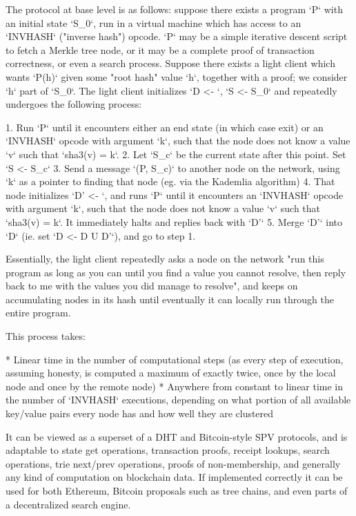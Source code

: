 \documentclass[10pt,a4paper,oneside]{scrartcl}
\begin{document}
The protocol at base level is as follows: suppose there exists a program `P` with an initial state `S_0`, run in a virtual machine which has access to an `INVHASH` ("inverse hash") opcode. `P` may be a simple iterative descent script to fetch a Merkle tree node, or it may be a complete proof of transaction correctness, or even a search process. Suppose there exists a light client which wants `P(h)` given some "root hash" value `h`, together with a proof; we consider `h` part of `S_0`. The light client initializes `D <- {}`, `S <- S_0` and repeatedly undergoes the following process:

1. Run `P` until it encounters either an end state (in which case exit) or an `INVHASH` opcode with argument `k`, such that the node does not know a value `v` such that `sha3(v) = k`.
2. Let `S_c` be the current state after this point. Set `S <- S_c`
3. Send a message `(P, S_c)` to another node on the network, using `k` as a pointer to finding that node (eg. via the Kademlia algorithm)
4. That node initializes `D' <- {}`, and runs `P` until it encounters an `INVHASH` opcode with argument `k`, such that the node does not know a value `v` such that `sha3(v) = k`. It immediately halts and replies back with `D'`
5. Merge `D'` into `D` (ie. set `D <- D U D'`), and go to step 1.

Essentially, the light client repeatedly asks a node on the network "run this program as long as you can until you find a value you cannot resolve, then reply back to me with the values you did manage to resolve", and keeps on accumulating nodes in its hash until eventually it can locally run through the entire program.

This process takes:

* Linear time in the number of computational steps (as every step of execution, assuming honesty, is computed a maximum of exactly twice, once by the local node and once by the remote node)
* Anywhere from constant to linear time in the number of `INVHASH` executions, depending on what portion of all available key/value pairs every node has and how well they are clustered

It can be viewed as a superset of a DHT and Bitcoin-style SPV protocols, and is adaptable to state get operations, transaction proofs, receipt lookups, search operations, trie next/prev operations, proofs of non-membership, and generally any kind of computation on blockchain data. If implemented correctly it can be used for both Ethereum, Bitcoin proposals such as tree chains, and even parts of a decentralized search engine.
\end{document}
